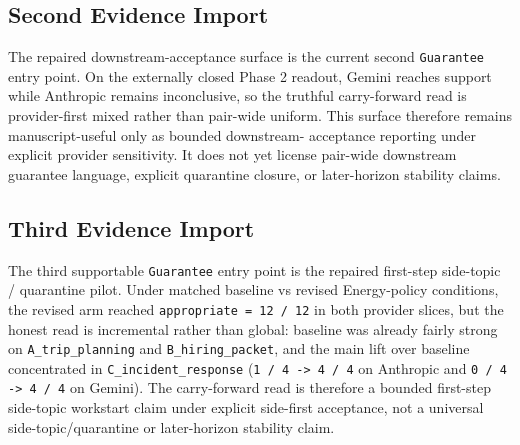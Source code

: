 \documentclass[11pt]{article}
\begin{document}
\subsection{Second Evidence Import}

The repaired downstream-acceptance surface is the current second
\texttt{Guarantee} entry point. On the externally closed Phase 2 readout,
Gemini reaches support while Anthropic remains inconclusive, so the truthful
carry-forward read is provider-first mixed rather than pair-wide uniform. This
surface therefore remains manuscript-useful only as bounded downstream-
acceptance reporting under explicit provider sensitivity. It does not yet
license pair-wide downstream guarantee language, explicit quarantine closure, or
later-horizon stability claims.

\subsection{Third Evidence Import}

The third supportable \texttt{Guarantee} entry point is the repaired first-step
side-topic / quarantine pilot. Under matched baseline vs revised Energy-policy
conditions, the revised arm reached \texttt{appropriate = 12 / 12} in both
provider slices, but the honest read is incremental rather than global:
baseline was already fairly strong on \texttt{A\_trip\_planning} and
\texttt{B\_hiring\_packet}, and the main lift over baseline concentrated in
\texttt{C\_incident\_response} (\texttt{1 / 4 -> 4 / 4} on Anthropic and
\texttt{0 / 4 -> 4 / 4} on Gemini). The carry-forward read is therefore a
bounded first-step side-topic workstart claim under explicit side-first
acceptance, not a universal side-topic/quarantine or later-horizon stability
claim.
\end{document}
